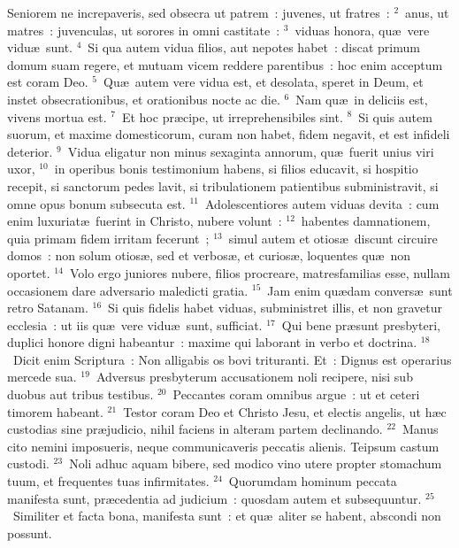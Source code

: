 \bchapter
\lettrine[lines=3,image=true,loversize=0.05,lraise=-0.03]{S}{}eniorem ne increpaveris, sed obsecra ut patrem~: juvenes, ut fratres~:
${}^{2}$~anus, ut matres~: juvenculas, ut sorores in omni castitate~:
${}^{3}$~viduas honora, qu\ae\ vere vidu\ae\ sunt.
${}^{4}$~Si qua autem vidua filios, aut nepotes habet~: discat primum domum suam regere, et mutuam vicem reddere parentibus~: hoc enim acceptum est coram Deo.
${}^{5}$~Qu\ae\ autem vere vidua est, et desolata, speret in Deum, et instet obsecrationibus, et orationibus nocte ac die.
${}^{6}$~Nam qu\ae\ in deliciis est, vivens mortua est.
${}^{7}$~Et hoc pr\ae cipe, ut irreprehensibiles sint.
${}^{8}$~Si quis autem suorum, et maxime domesticorum, curam non habet, fidem negavit, et est infideli deterior.
${}^{9}$~Vidua eligatur non minus sexaginta annorum, qu\ae\ fuerit unius viri uxor,
${}^{10}$~in operibus bonis testimonium habens, si filios educavit, si hospitio recepit, si sanctorum pedes lavit, si tribulationem patientibus subministravit, si omne opus bonum subsecuta est.
${}^{11}$~Adolescentiores autem viduas devita~: cum enim luxuriat\ae\ fuerint in Christo, nubere volunt~:
${}^{12}$~habentes damnationem, quia primam fidem irritam fecerunt~;
${}^{13}$~simul autem et otios\ae\ discunt circuire domos~: non solum otios\ae , sed et verbos\ae , et curios\ae , loquentes qu\ae\ non oportet.
${}^{14}$~Volo ergo juniores nubere, filios procreare, matresfamilias esse, nullam occasionem dare adversario maledicti gratia.
${}^{15}$~Jam enim qu\ae dam convers\ae\ sunt retro Satanam.
${}^{16}$~Si quis fidelis habet viduas, subministret illis, et non gravetur ecclesia~: ut iis qu\ae\ vere vidu\ae\ sunt, sufficiat.
${}^{17}$~Qui bene pr\ae sunt presbyteri, duplici honore digni habeantur~: maxime qui laborant in verbo et doctrina.
${}^{18}$~Dicit enim Scriptura~: Non alligabis os bovi trituranti. Et~: Dignus est operarius mercede sua.
${}^{19}$~Adversus presbyterum accusationem noli recipere, nisi sub duobus aut tribus testibus.
${}^{20}$~Peccantes coram omnibus argue~: ut et ceteri timorem habeant.
${}^{21}$~Testor coram Deo et Christo Jesu, et electis angelis, ut h\ae c custodias sine pr\ae judicio, nihil faciens in alteram partem declinando.
${}^{22}$~Manus cito nemini imposueris, neque communicaveris peccatis alienis. Teipsum castum custodi.
${}^{23}$~Noli adhuc aquam bibere, sed modico vino utere propter stomachum tuum, et frequentes tuas infirmitates.
${}^{24}$~Quorumdam hominum peccata manifesta sunt, pr\ae cedentia ad judicium~: quosdam autem et subsequuntur.
${}^{25}$~Similiter et facta bona, manifesta sunt~: et qu\ae\ aliter se habent, abscondi non possunt.

